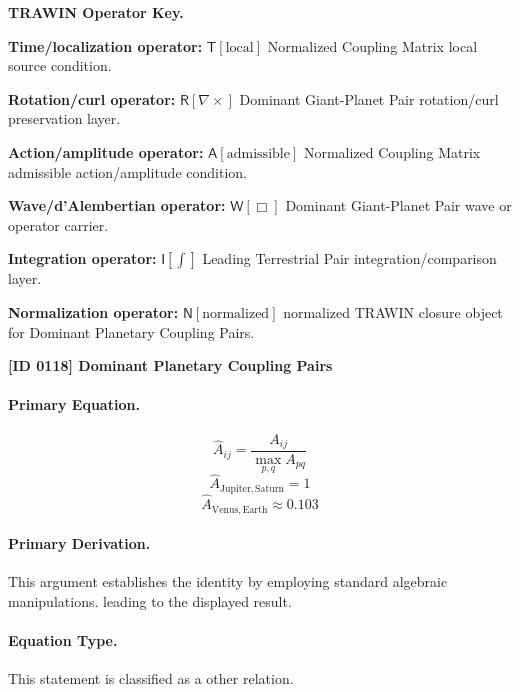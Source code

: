 \par\vspace{0.45\baselineskip}
\noindent\begin{minipage}[t]{\linewidth}
\begingroup
\small
\raggedright
\textbf{TRAWIN Operator Key.}\par
\noindent\textbf{Time/localization operator:} $\mathsf{T}\!\left[\mathrm{local}\right]$ Normalized Coupling Matrix local source condition.\par
\noindent\textbf{Rotation/curl operator:} $\mathsf{R}\!\left[\nabla\times\right]$ Dominant Giant-Planet Pair rotation/curl preservation layer.\par
\noindent\textbf{Action/amplitude operator:} $\mathsf{A}\!\left[\mathrm{admissible}\right]$ Normalized Coupling Matrix admissible action/amplitude condition.\par
\noindent\textbf{Wave/d'Alembertian operator:} $\mathsf{W}\!\left[\Box\right]$ Dominant Giant-Planet Pair wave or operator carrier.\par
\noindent\textbf{Integration operator:} $\mathsf{I}\!\left[\int\right]$ Leading Terrestrial Pair integration/comparison layer.\par
\noindent\textbf{Normalization operator:} $\mathsf{N}\!\left[\mathrm{normalized}\right]$ normalized TRAWIN closure object for Dominant Planetary Coupling Pairs.\par
\endgroup
\end{minipage}

\clearpage
\noindent\textbf{[ID 0118] Dominant Planetary Coupling Pairs}\par
\vspace{0.35em}
\paragraph{Primary Equation.}
\[
\widehat{A}_{ij}=\frac{A_{ij}}{\max_{p,q}A_{pq}}
\]
\[
\widehat{A}_{\mathrm{Jupiter,Saturn}} = 1
\]
\[
\widehat{A}_{\mathrm{Venus,Earth}} \approx 0.103
\]

\paragraph{Primary Derivation.}
This argument establishes the identity by employing standard algebraic manipulations. leading to the displayed result.
\paragraph{Equation Type.}
This statement is classified as a other relation.

